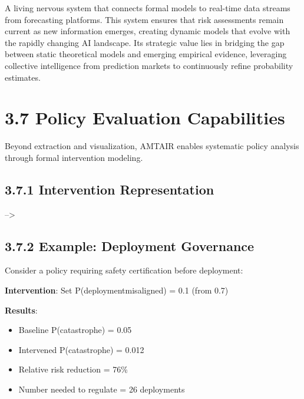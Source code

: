 \documentclass[
  11pt,
  letterpaper,
]{book}
\providecommand{\tightlist}{%
  \setlength{\itemsep}{0pt}\setlength{\parskip}{0pt}}
\begin{document}
A living nervous system that connects formal models to real-time data
streams from forecasting platforms. This system ensures that risk
assessments remain current as new information emerges, creating dynamic
models that evolve with the rapidly changing AI landscape. Its strategic
value lies in bridging the gap between static theoretical models and
emerging empirical evidence, leveraging collective intelligence from
prediction markets to continuously refine probability estimates.

\section*{3.7 Policy Evaluation
Capabilities}\label{sec-policy-evaluation}


Beyond extraction and visualization, AMTAIR enables systematic policy
analysis through formal intervention modeling.

\subsection*{3.7.1 Intervention
Representation}\label{sec-intervention-representation}

--\textgreater{}

\subsection*{3.7.2 Example: Deployment
Governance}\label{sec-deployment-example}

Consider a policy requiring safety certification before deployment:

\textbf{Intervention}: Set P(deployment\textbar misaligned) = 0.1 (from
0.7)

\textbf{Results}:

\begin{itemize}
\tightlist
\item
  Baseline P(catastrophe) = 0.05
\item
  Intervened P(catastrophe) = 0.012
\item
  Relative risk reduction = 76\%
\item
  Number needed to regulate = 26 deployments
\end{itemize}
\end{document}
